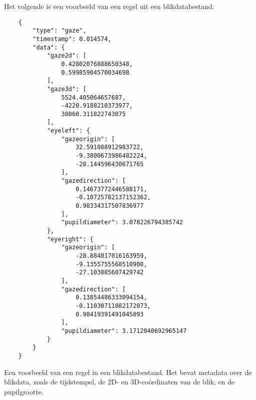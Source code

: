 Het volgende is een voorbeeld van een regel uit een blikdatabestand:
\begin{listing}
  \begin{verbatim}
    {
        "type": "gaze",
        "timestamp": 0.014574,
        "data": {
            "gaze2d": [
                0.42802076888650348,
                0.59985904570034698
            ],
            "gaze3d": [
                5524.405064657687,
                -4220.9188210373977,
                38060.311822743075
            ],
            "eyeleft": {
                "gazeorigin": [
                    32.591088912983722,
                    -9.3800673986482224,
                    -28.144596430671765
                ],
                "gazedirection": [
                    0.14673772446588171,
                    -0.10725782137152362,
                    0.98334317507836977
                ],
                "pupildiameter": 3.078226794385742
            },
            "eyeright": {
                "gazeorigin": [
                    -28.884017016163959,
                    -9.1355755568510908,
                    -27.103885607429742
                ],
                "gazedirection": [
                    0.13854486333094154,
                    -0.11030711082172073,
                    0.98419391491045893
                ],
                "pupildiameter": 3.1712040692965147
            }
        }
    }
  \end{verbatim}
  \caption[Voorbeeld van een regel in een blikdatabestand]{
    Een voorbeeld van een regel in een blikdatabestand. 
    Het bevat metadata over de blikdata, zoals de tijdstempel, de 2D- en 3D-coördinaten van de blik, en de pupilgrootte.
  }
\end{listing}

